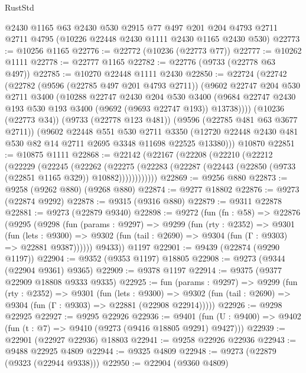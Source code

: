 \begin{lexlean}{RustStd}
\begin{coremodule}
    @2430
    @1165
    @63
    @2430
    @530
    @2915
    @77
    @497
    @201
    @204
    @4793
    @2711
    @2711
    @4795
    (@10226 @22448 @2430 @1111 @2430 @1165 @2430 @530)
@22773 := @10256 @1165
@22776 := @22772 (@10236 (@22773 @77))
@22777 := @10262 @1111
@22778 := @22777 @1165
@22782 := @22776 (@9733 (@22778 @63 @497))
@22785 := @10270 @22448 @1111 @2430
@22850 := @22724
    (@22742
      (@22782
        (@9596 (@22785 @497 @201 @4793 @2711))
        (@9602
          @22747
          @204
          @530
          @2711
          @3400
          (@10288
            @22747
            @2430
            @204
            @530
            @3400
            (@9684 @22747 @2430 @193 @530 @193 @3400 (@9692 (@9693 @22747 @193)) @13738))))
      (@10236 (@22773 @34))
      (@9733 (@22778 @123 @481))
      (@9596 (@22785 @481 @63 @3677 @2711))
      (@9602
        @22448
        @551
        @530
        @2711
        @3350
        (@12720 @22448 @2430 @481 @530 @82 @14 @2711 @2695 @3348 @11698 @22525 @13380)))
    @10870
@22851 := @10875 @1111
@22868 := @22142
    (@22167
      (@22208
        (@22210
          (@22212
            (@22229
              (@22245
                (@22262
                  (@22275
                    (@22283 (@22287 (@22443 (@22850 (@9733 (@22851 @1165 @329)) @10882))))))))))))
@22869 := @9256 @880
@22873 := @9258 (@9262 @880) (@9268 @880)
@22874 := @9277 @18802
@22876 := @9273 (@22874 @9292)
@22878 := @9315 (@9316 @880)
@22879 := @9311 @22878
@22881 := @9273 (@22879 @9340)
@22898 := @9272
    (fun (fn : @58) =>
    @22876
      (@9295
        (@9298
          (fun (params : @9297) =>
          @9299
            (fun (rty : @2352) =>
            @9301
              (fun (lets : @9300) =>
              @9302 (fun (tail : @2690) => @9304 (fun (Γ : @9303) => @22881 @9387))))))
        @9433))
    @1197
@22901 := @9439 (@22874 (@9290 @1197))
@22904 := @9352 (@9353 @1197) @18805
@22908 := @9273 (@9344 (@22904 @9361) @9365)
@22909 := @9378 @1197
@22914 := @9375 (@9377 @22909 @18808 @9333 @9335)
@22925 := fun (params : @9297) =>
  @9299
    (fun (rty : @2352) =>
    @9301
      (fun (lets : @9300) =>
      @9302 (fun (tail : @2690) => @9304 (fun (Γ : @9303) => @22881 (@22908 @22914)))))
@22926 := @9298 @22925
@22927 := @9295 @22926
@22936 := @9401
    (fun (U : @9400) => @9402 (fun (t : @7) => @9410 (@9273 (@9416 @18805 @9291) @9427)))
@22939 := @22901 (@22927 @22936) @18803
@22941 := @9258 @22926 @22936
@22943 := @9488 @22925 @4809
@22944 := @9325 @4809
@22948 := @9273 (@22879 (@9323 (@22944 @9338)))
@22950 := @22904 (@9360 @4809)

\end{coremodule}
\end{lexlean}
